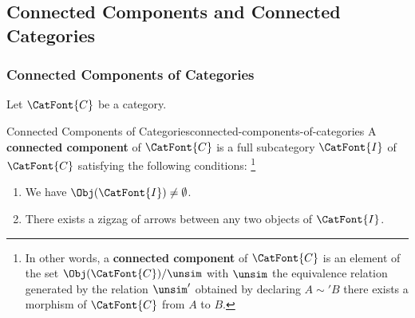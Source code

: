 \subsection{Connected Components and Connected Categories}\label{subsection-connected-components-and-connected-categories}
\subsubsection{Connected Components of Categories}\label{subsubsection-the-quadruple-adjunction-with-sets-connected-components-of-categories}
Let $\CatFont{C}$ be a category.
\begin{definition}{Connected Components of Categories}{connected-components-of-categories}%
    A \textbf{connected component} of $\CatFont{C}$ is a full subcategory $\CatFont{I}$ of $\CatFont{C}$ satisfying the following conditions:%
    \footnote{%
        In other words, a \textbf{connected component} of $\CatFont{C}$ is an element of the set $\Obj(\CatFont{C})/\unsim$ with $\unsim$ the equivalence relation generated by the relation $\unsim'$ obtained by declaring $A\sim' B$ \textiff there exists a morphism of $\CatFont{C}$ from $A$ to $B$.
        \par\vspace*{-1.75\baselineskip}
    }%
    \begin{enumerate}
        \item{}We have $\Obj(\CatFont{I})\neq\emptyset$.
        \item{}There exists a zigzag of arrows between any two objects of $\CatFont{I}$.
    \end{enumerate}
\end{definition}
